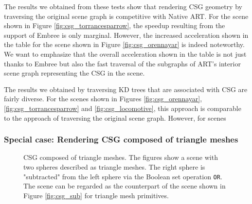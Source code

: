 The results we obtained from these tests show that rendering CSG geometry by traversing the original scene graph is competitive with Native ART. For the scene shown in Figure \ref{fig:csg_torrancesparrow}, the speedup resulting from the support of Embree is only marginal. However, the increased acceleration shown in the table for the scene shown in Figure \ref{fig:csg_orennayar} is indeed noteworthy. We want to emphasize that the overall acceleration shown in the table is not just thanks to Embree but also the fast traversal of the subgraphs of ART's interior scene graph representing the CSG in the scene.

The results we obtained by traversing KD trees that are associated with CSG are fairly diverse. For the scenes shown in Figures \ref{fig:csg_orennayar}, \ref{fig:csg_torrancesparrow} and \ref{fig:csg_locomotive}, this approach is comparable to the approach of traversing the original scene graph. However, for scenes

\subsubsection{Special case: Rendering CSG composed of triangle meshes}

\begin{figure}[h]
	\centering
	\hfil
	\caption{CSG composed of triangle meshes. The figures show a scene with two spheres described as triangle meshes. The right sphere is "subtracted" from the left sphere via the Boolean set operation \texttt{OR}. The scene can be regarded as the counterpart of the scene shown in Figure \ref{fig:csg_sub} for triangle mesh primitives.}
	\label{fig:csg_mesh_results}
\end{figure}

